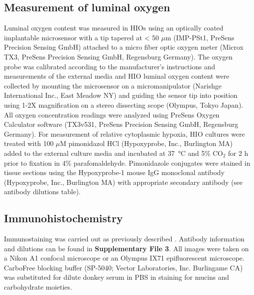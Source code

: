 \documentclass[9pt,lineo]{elife}
\begin{document}
\subsection*{{\bfseries\sffamily } Measurement of luminal oxygen}
\label{sec:orgheadline18}
Luminal oxygen content was measured in HIOs using an optically coated implantable microsensor with a tip tapered at < 50 \(\mu\)m (IMP-PSt1, PreSens Precision Sensing GmbH) attached to a micro fiber optic oxygen meter (Microx TX3, PreSens Precision Sensing GmbH, Regensburg Germany). The oxygen probe was calibrated according to the manufacturer's instructions and measurements of the external media and HIO luminal oxygen content were collected by mounting the microsensor on a micromanipulator (Narishge International Inc., East Meadow NY) and guiding the sensor tip into position using 1-2X magnification on a stereo dissecting scope (Olympus, Tokyo Japan). All oxygen concentration readings were analyzed using PreSens Oxygen Calculator software (TX3v531, PreSens Precision Sensing GmbH, Regensburg Germany). 
For measurement of relative cytoplasmic hypoxia, HIO cultures were treated with 100 \(\mu\)M pimonidazol HCl (Hypoxyprobe, Inc., Burlington MA) added to the external culture media and incubated at \SI{37}{\celsius} and 5\% CO\(_{\text{2}}\) for 2 h prior to fixation in 4\% parafomaldehyde. Pimonidazole conjugates were stained in tissue sections using the Hypoxyprobe-1 mouse IgG monoclonal antibody (Hypoxyprobe, Inc., Burlington MA) with appropriate secondary antibody (see antibody dilutions table).
\subsection*{{\bfseries\sffamily } Immunohistochemistry}
\label{sec:orgheadline19}
Immunostaining was carried out as previously described \citep{Finkbeiner:2015}. Antibody information and dilutions can be found in \textbf{Supplementary File 3}. All images were taken on a Nikon A1 confocal microscope or an Olympus IX71 epifluorescent microscope. CarboFree blocking buffer (SP-5040; Vector Laboratories, Inc. Burlingame CA) was substituted for dilute donkey serum in PBS in staining for mucins and carbohydrate moieties.
\end{document}
